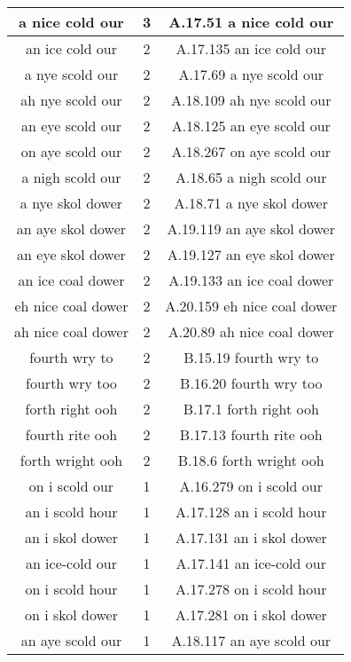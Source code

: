 \begin{center}
\begin{longtable}{|c|c|c|}
\hline
a nice cold our   & 3 & A.17.51    a nice cold our  \\
\hline
an ice cold our   & 2 & A.17.135    an ice cold our  \\
\hline 
a nye scold our   & 2 & A.17.69    a nye scold our  \\
\hline 
ah nye scold our   & 2 & A.18.109    ah nye scold our  \\
\hline 
an eye scold our   & 2 & A.18.125    an eye scold our  \\
\hline 
on aye scold our   & 2 & A.18.267    on aye scold our  \\
\hline 
a nigh scold our   & 2 & A.18.65    a nigh scold our  \\
\hline 
a nye skol dower   & 2 & A.18.71    a nye skol dower  \\
\hline 
an aye skol dower   & 2 & A.19.119    an aye skol dower  \\
\hline 
an eye skol dower   & 2 & A.19.127    an eye skol dower  \\
\hline 
an ice coal dower   & 2 & A.19.133    an ice coal dower  \\
\hline 
eh nice coal dower   & 2 & A.20.159    eh nice coal dower  \\
\hline 
ah nice coal dower   & 2 & A.20.89    ah nice coal dower  \\
\hline 
fourth wry to   & 2 & B.15.19    fourth wry to  \\
\hline 
fourth wry too   & 2 & B.16.20    fourth wry too  \\
\hline 
forth right ooh   & 2 & B.17.1    forth right ooh  \\
\hline 
fourth rite ooh   & 2 & B.17.13    fourth rite ooh  \\
\hline 
forth wright ooh   & 2 & B.18.6    forth wright ooh  \\
\hline 
on i scold our   & 1 & A.16.279    on i scold our  \\
\hline 
an i scold hour   & 1 & A.17.128    an i scold hour  \\
\hline 
an i skol dower   & 1 & A.17.131    an i skol dower  \\
\hline 
an ice-cold our   & 1 & A.17.141    an ice-cold our  \\
\hline 
on i scold hour   & 1 & A.17.278    on i scold hour  \\
\hline 
on i skol dower   & 1 & A.17.281    on i skol dower  \\
\hline 
an aye scold our   & 1 & A.18.117    an aye scold our  \\

\end{longtable}
\end{center}
